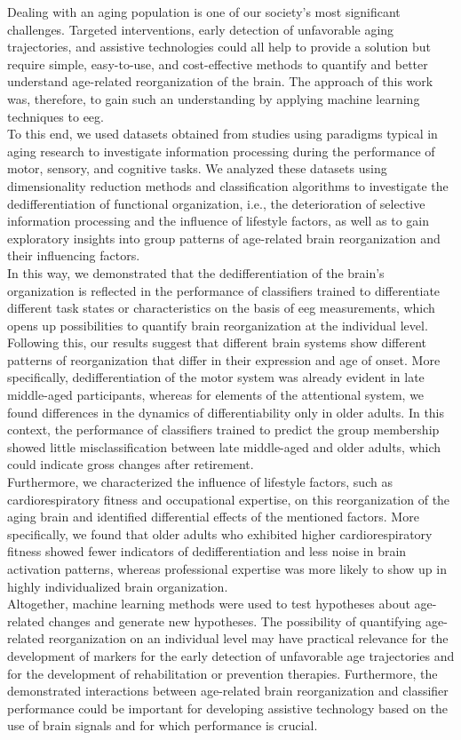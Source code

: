 Dealing with an aging population is one of our society's most significant challenges. Targeted interventions, early detection of unfavorable aging trajectories, and assistive technologies could all help to provide a solution but require simple, easy-to-use, and cost-effective methods to quantify and better understand age-related reorganization of the brain. The approach of this work was, therefore, to gain such an understanding by applying machine learning techniques to \gls{eeg}.\\
To this end, we used datasets obtained from studies using paradigms typical in aging research to investigate information processing during the performance of motor, sensory, and cognitive tasks. We analyzed these datasets using dimensionality reduction methods and classification algorithms to investigate the dedifferentiation of functional organization, i.e., the deterioration of selective information processing and the influence of lifestyle factors, as well as to gain exploratory insights into group patterns of age-related brain reorganization and their influencing factors.\\
In this way, we demonstrated that the dedifferentiation of the brain's organization is reflected in the performance of classifiers trained to differentiate different task states or characteristics on the basis of \gls{eeg} measurements, which opens up possibilities to quantify brain reorganization at the individual level. Following this, our results suggest that different brain systems show different patterns of reorganization that differ in their expression and age of onset. More specifically, dedifferentiation of the motor system was already evident in late middle-aged participants, whereas for elements of the attentional system, we found differences in the dynamics of differentiability only in older adults. In this context, the performance of classifiers trained to predict the group membership showed little misclassification between late middle-aged and older adults, which could indicate gross changes after retirement.\\
Furthermore, we characterized the influence of lifestyle factors, such as cardiorespiratory fitness and occupational expertise, on this reorganization of the aging brain and identified differential effects of the mentioned factors. More specifically, we found that older adults who exhibited higher cardiorespiratory fitness showed fewer indicators of dedifferentiation and less noise in brain activation patterns, whereas professional expertise was more likely to show up in highly individualized brain organization.\\
Altogether, machine learning methods were used to test hypotheses about age-related changes and generate new hypotheses. The possibility of quantifying age-related reorganization on an individual level may have practical relevance for the development of markers for the early detection of unfavorable age trajectories and for the development of rehabilitation or prevention therapies. Furthermore, the demonstrated interactions between age-related brain reorganization and classifier performance could be important for developing assistive technology based on the use of brain signals and for which performance is crucial.

